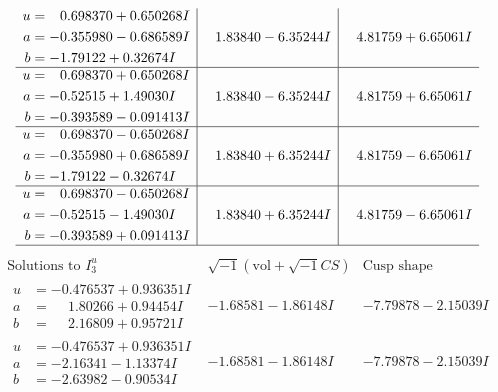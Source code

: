 \documentclass[1p]{elsarticle_modified}
\theoremstyle{definition}
\newcommand{\I}{\sqrt{-1}}
\begin{document}
$$\begin{array}{c|c|c}
\begin{aligned}
u &= \phantom{-}0.698370 + 0.650268 I \\
a &= -0.355980 - 0.686589 I \\
b &= -1.79122 + 0.32674 I\end{aligned}
 & \phantom{-}1.83840 - 6.35244 I & \phantom{-}4.81759 + 6.65061 I \\ \hline\begin{aligned}
u &= \phantom{-}0.698370 + 0.650268 I \\
a &= -0.52515 + 1.49030 I \\
b &= -0.393589 - 0.091413 I\end{aligned}
 & \phantom{-}1.83840 - 6.35244 I & \phantom{-}4.81759 + 6.65061 I \\ \hline\begin{aligned}
u &= \phantom{-}0.698370 - 0.650268 I \\
a &= -0.355980 + 0.686589 I \\
b &= -1.79122 - 0.32674 I\end{aligned}
 & \phantom{-}1.83840 + 6.35244 I & \phantom{-}4.81759 - 6.65061 I \\ \hline\begin{aligned}
u &= \phantom{-}0.698370 - 0.650268 I \\
a &= -0.52515 - 1.49030 I \\
b &= -0.393589 + 0.091413 I\end{aligned}
 & \phantom{-}1.83840 + 6.35244 I & \phantom{-}4.81759 - 6.65061 I\\
 \hline 
 \end{array}$$\newpage$$\begin{array}{c|c|c}  
\text{Solutions to }I^u_{3}& \I (\text{vol} + \sqrt{-1}CS) & \text{Cusp shape}\\
 \hline 
\begin{aligned}
u &= -0.476537 + 0.936351 I \\
a &= \phantom{-}1.80266 + 0.94454 I \\
b &= \phantom{-}2.16809 + 0.95721 I\end{aligned}
 & -1.68581 - 1.86148 I & -7.79878 - 2.15039 I \\ \hline\begin{aligned}
u &= -0.476537 + 0.936351 I \\
a &= -2.16341 - 1.13374 I \\
b &= -2.63982 - 0.90534 I\end{aligned}
 & -1.68581 - 1.86148 I & -7.79878 - 2.15039 I \\ \hline\begin{aligned}

\end{aligned}
\end{array}$$
\end{document}
